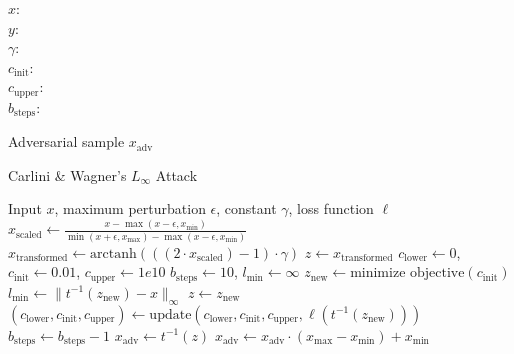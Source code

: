 $x$:  \\
$y$:  \\
$\gamma$:  \\
$c_{\text{init}}$:  \\
$c_{\text{upper}}$:  \\
$b_{\text{steps}}$: 

Adversarial sample $x_{\text{adv}}$

\begin{algorithm}
\caption{Carlini \& Wagner's $L_{\infty}$ Attack}
\begin{algorithmic}[1]
\REQUIRE Input $x$, maximum perturbation $\epsilon$, constant $\gamma$, loss function $\ell$
\STATE $x_{\text{scaled}} \leftarrow \frac{x - \max(x - \epsilon, x_{\text{min}})}{\min(x + \epsilon, x_{\text{max}}) - \max(x - \epsilon, x_{\text{min}})}$
\STATE $x_{\text{transformed}} \leftarrow \text{arctanh}\left( ((2 \cdot x_{\text{scaled}}) - 1) \cdot \gamma \right)$
\STATE $z \leftarrow x_{\text{transformed}}$
\STATE $c_{\text{lower}} \leftarrow 0$, $c_{\text{init}} \leftarrow 0.01$, $c_{\text{upper}} \leftarrow 1e10$
\STATE $b_{\text{steps}} \leftarrow 10$, $l_{\text{min}} \leftarrow \infty$
    \STATE $z_{\text{new}} \leftarrow \text{minimize objective}(c_{\text{init}})$
        \STATE $l_{\text{min}} \leftarrow \|t^{-1}(z_{\text{new}}) - x\|_{\infty}$
        \STATE $z \leftarrow z_{\text{new}}$
    \ENDIF
    \STATE $(c_{\text{lower}}, c_{\text{init}}, c_{\text{upper}}) \leftarrow \text{update}(c_{\text{lower}}, c_{\text{init}}, c_{\text{upper}}, \ell(t^{-1}(z_{\text{new}})))$
    \STATE $b_{\text{steps}} \leftarrow b_{\text{steps}} - 1$
\ENDWHILE
\STATE $x_{\text{adv}} \leftarrow t^{-1}(z)$
\STATE $x_{\text{adv}} \leftarrow x_{\text{adv}} \cdot (x_{\text{max}} - x_{\text{min}}) + x_{\text{min}}$
\OUTPUT 
\end{algorithmic}
\end{algorithm}


